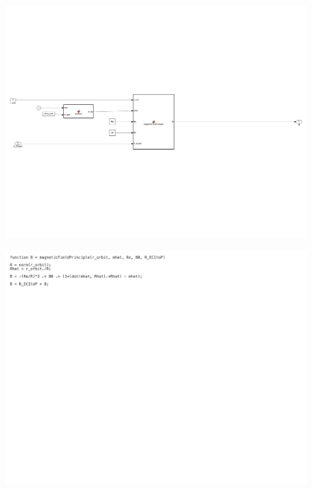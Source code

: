 \begin{figure}[H]
    \centering
    \includegraphics[trim={0.25cm 6cm 0.25cm 6cm},clip,width = 15cm]{Images/PS5/magneticField-4.png}
\end{figure}

\begin{figure}[H]
    \centering
    \includegraphics[trim={0cm 15cm 10cm 0cm},clip,width = 15cm]{Images/PS5/magneticField-5.png}
\end{figure}

